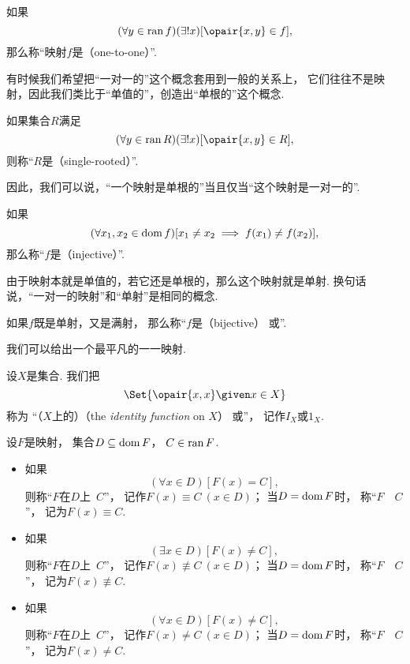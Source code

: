 如果\[
	(\forall y \in \ran f)
	(\exists! x)
	[\opair{x,y} \in f],
\]
那么称“映射\(f\)是（one-to-one）”.

有时候我们希望把“一对一的”这个概念套用到一般的关系上，
它们往往不是映射，因此我们类比于“单值的”，创造出“单根的”这个概念.
\begin{definition}
如果集合\(R\)满足\[
	(\forall y \in \ran R)
	(\exists! x)
	[\opair{x,y} \in R],
\]
则称“\(R\)是（single-rooted）”.
\end{definition}

因此，我们可以说，“一个映射是单根的”当且仅当“这个映射是一对一的”.

如果\[
	(\forall x_1, x_2 \in \operatorname{dom} f)
	[x_1 \neq x_2 \implies f(x_1) \neq f(x_2)],
\]
那么称“\(f\)是（injective）”.

由于映射本就是单值的，若它还是单根的，那么这个映射就是单射.
换句话说，“一对一的映射”和“单射”是相同的概念.

如果\(f\)既是单射，又是满射，
那么称“\(f\)是（bijective）
或”.

我们可以给出一个最平凡的一一映射.
\begin{definition}
设\(X\)是集合.
我们把\[
	\Set{ \opair{x,x} \given x \in X }
\]称为
“（\(X\)上的）（the \emph{identity function} on \(X\)）
或”，
记作\(I_X\)或\(1_X\).
\end{definition}

\begin{definition}
设\(F\)是映射，
集合\(D \subseteq \operatorname{dom} F\)，
\(C \in \operatorname{ran} F\).
\begin{itemize}
	\item 如果\[
		(\forall x \in D)[F(x) = C],
	\]
	则称“\(F\)在\(D\)上~\(C\)”，
	记作\(F(x) \equiv C\ (x \in D)\)；
	当\(D=\operatorname{dom} F\)时，
	称“\(F\)~~\(C\)”，
	记为\(F(x) \equiv C\).
	\item 如果\[
		(\exists x \in D)[F(x) \neq C],
	\]
	则称“\(F\)在\(D\)上~\(C\)”，
	记作\(F(x) \not\equiv C\ (x \in D)\)；
	当\(D=\operatorname{dom} F\)时，
	称“\(F\)~~\(C\)”，
	记为\(F(x) \not\equiv C\).
	\item 如果\[
		(\forall x \in D)[F(x) \neq C],
	\]
	则称“\(F\)在\(D\)上~\(C\)”，
	记作\(F(x) \neq C\ (x \in D)\)；
	当\(D=\operatorname{dom} F\)时，
	称“\(F\)~~\(C\)”，
	记为\(F(x) \neq C\).
\end{itemize}
\end{definition}


